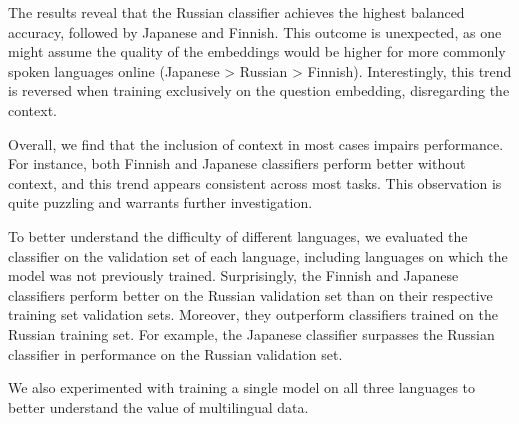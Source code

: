 \documentclass[11pt]{article}
\begin{document}
The results reveal that the Russian classifier achieves the highest balanced accuracy, followed by Japanese and Finnish.
This outcome is unexpected, as one might assume the quality of the embeddings would be higher for more commonly spoken languages online (Japanese > Russian > Finnish).
Interestingly, this trend is reversed when training exclusively on the question embedding, disregarding the context. 

Overall, we find that the inclusion of context in most cases impairs performance. For instance, both Finnish and Japanese classifiers perform better without context, and this trend appears consistent across most tasks. This observation is quite puzzling and warrants further investigation.

To better understand the difficulty of different languages, we evaluated the classifier on the validation set of each language, including languages on which the model was not previously trained.
Surprisingly, the Finnish and Japanese classifiers perform better on the Russian validation set than on their respective training set validation sets. Moreover, they outperform classifiers trained on the Russian training set.
For example, the Japanese classifier surpasses the Russian classifier in performance on the Russian validation set.

We also experimented with training a single model on all three languages to better understand the value of multilingual data.

\begin{table}[ht]
    \centering
    \caption{Model performance for language-specific and combined training, with and without context}
    \label{tab:model_performance}
\end{table}
\end{document}
